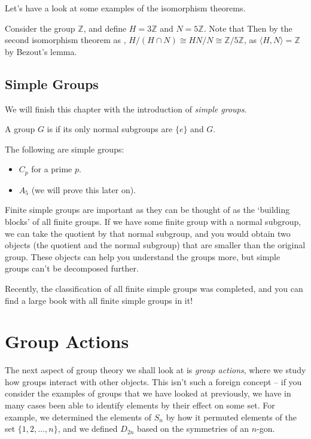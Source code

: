 \documentclass[a4paper]{scrartcl}
\begin{document}
Let's have a look at some examples of the isomorphism theorems.

\begin{example}
	Consider the group $\mathbb{Z}$, and define $H = 3\mathbb{Z}$ and $N = 5\mathbb{Z}$. Note that 
	Then by the second isomorphism theorem as , $H/(H \cap N) \cong HN/N \cong \mathbb{Z}/5\mathbb{Z}$, as $\langle H, N \rangle = \mathbb{Z}$ by Bezout's lemma.
\end{example}


\subsection{Simple Groups}

We will finish this chapter with the introduction of \emph{simple groups}.

\begin{definition}
	A group $G$ is  if its only normal subgroups are $\{e\}$ and $G$.
\end{definition}

\begin{example}
The following are simple groups:
\begin{itemize}
	\item $C_p$ for a prime $p$.
	\item $A_5$ (we will prove this later on).
\end{itemize}	
\end{example}

Finite simple groups are important as they can be thought of as the `building blocks' of all finite groups. If we have some finite group with a normal subgroup, we can take the quotient by that normal subgroup, and you would obtain two objects (the quotient and the normal subgroup) that are smaller than the original group. These objects can help you understand the groups more, but simple groups can't be decomposed further.

Recently, the classification of all finite simple groups was completed, and you can find a large book with all finite simple groups in it!

\section{Group Actions}

The next aspect of group theory we shall look at is \emph{group actions}, where we study how groups interact with other objects. This isn't such a foreign concept -- if you consider the examples of groups that we have looked at previously, we have in many cases been able to identify elements by their effect on some set. For example, we determined the elements of $S_n$ by how it permuted elements of the set $\{1, 2, \dots, n\}$, and we defined $D_{2n}$ based on the symmetries of an $n$-gon.
\end{document}
